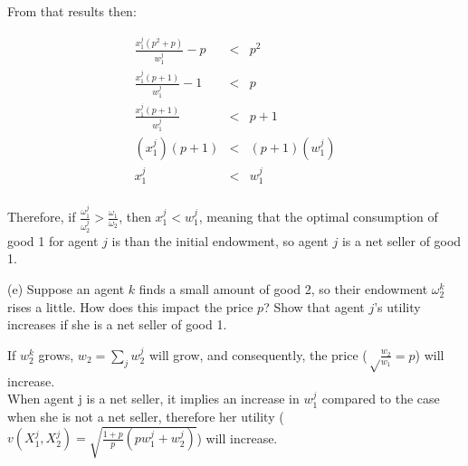 From that results then:


\begin{eqnarray*}
\frac{x_1^j(p^2+p)}{w_1^j}-p&<&p^2\\
\frac{x_1^j(p+1)}{w_1^j}-1&<&p\\
\frac{x_1^j(p+1)}{w_1^j}&<&p+1\\
(x_1^j)(p+1)&<&(p+1)(w_1^j)\\
x_1^j&<&w_1^j\\
\end{eqnarray*}

\begin{myanswerbox}
    Therefore, if \( \frac{\omega^j_1}{\omega^j_2} > \frac{\omega_1}{\omega_2} \), then \( x_1^j<w_1^j \), meaning that the optimal consumption of good 1 for agent $j$ is than the initial endowment, so agent $j$ is a net seller of good 1.
\end{myanswerbox}
\begin{tcolorbox}
        (e) Suppose an agent \( k \) finds a small amount of good 2, so their endowment \( \omega^k_2 \) rises a little. How does this impact the price \( p \)? Show that agent \( j \)'s utility increases if she is a net seller of good 1.
\end{tcolorbox}

If $w_2^k$ grows, $ w_2= \sum_{j} w_2^j$ will grow, and consequently, the price ($\sqrt\frac{w_2}{w_1} = p$) will increase.\\

When agent j is a net seller, it implies an increase in $w_1^j$ compared to the case when she is not a net seller, therefore her utility ($v(X_1^j,X_2^j)=\sqrt{\frac{1+p}{p}(pw_1^j+w_2^j)}$) will increase.
